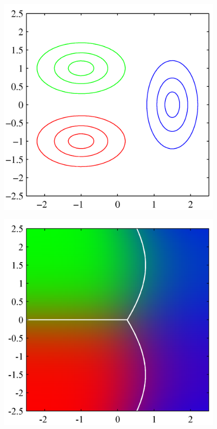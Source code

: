 \documentclass[b5paper]{book}
\numberwithin{equation}{chapter}
\begin{document}
{\begin{figure}[ht]
\begin{minipage}[t]{0.5\linewidth}
		\includegraphics[scale=0.8]{Images/4-11a.png}
		\label{fig:4-11a}
		\end{minipage}
		\begin{minipage}[t]{0.5\linewidth}
		\centering
		\includegraphics[scale=0.8]{Images/4-11b.png}

\end{minipage}
\end{figure}}
\end{document}
